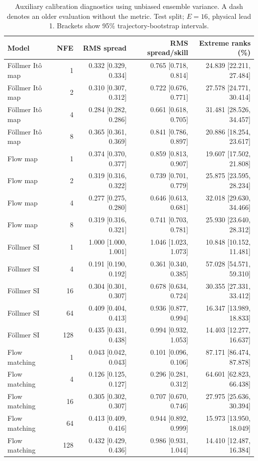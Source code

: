 \begin{table}[t]
\centering
\small
\setlength{\tabcolsep}{3pt}
\caption{Auxiliary calibration diagnostics using unbiased ensemble variance. A dash denotes an older evaluation without the metric. Test split; $E=16$, physical lead 1. Brackets show 95\% trajectory-bootstrap intervals.}
\label{tab:map-rms-calibration}
\begin{tabular}{lrrrr}
\toprule
Model & NFE & RMS spread & RMS spread/skill & Extreme ranks (\%) \\
\midrule
Föllmer Itô map & 1 & 0.332 [0.329, 0.334] & 0.765 [0.718, 0.814] & 24.839 [22.211, 27.484] \\
Föllmer Itô map & 2 & 0.310 [0.307, 0.312] & 0.722 [0.676, 0.771] & 27.578 [24.771, 30.414] \\
Föllmer Itô map & 4 & 0.284 [0.282, 0.286] & 0.661 [0.618, 0.705] & 31.481 [28.526, 34.457] \\
Föllmer Itô map & 8 & 0.365 [0.361, 0.369] & 0.841 [0.786, 0.897] & 20.886 [18.254, 23.617] \\
\addlinespace
Flow map & 1 & 0.374 [0.370, 0.377] & 0.859 [0.813, 0.907] & 19.607 [17.502, 21.808] \\
Flow map & 2 & 0.319 [0.316, 0.322] & 0.739 [0.701, 0.779] & 25.875 [23.595, 28.234] \\
Flow map & 4 & 0.277 [0.275, 0.280] & 0.646 [0.613, 0.681] & 32.018 [29.630, 34.466] \\
Flow map & 8 & 0.319 [0.316, 0.321] & 0.741 [0.703, 0.781] & 25.930 [23.640, 28.312] \\
\addlinespace
Föllmer SI & 1 & 1.000 [1.000, 1.001] & 1.046 [1.023, 1.073] & 10.848 [10.152, 11.481] \\
Föllmer SI & 4 & 0.191 [0.190, 0.192] & 0.361 [0.340, 0.385] & 57.028 [54.571, 59.310] \\
Föllmer SI & 16 & 0.304 [0.301, 0.307] & 0.678 [0.634, 0.724] & 30.355 [27.331, 33.412] \\
Föllmer SI & 64 & 0.409 [0.404, 0.413] & 0.936 [0.877, 0.994] & 16.347 [13.989, 18.833] \\
Föllmer SI & 128 & 0.435 [0.431, 0.438] & 0.994 [0.932, 1.053] & 14.403 [12.277, 16.637] \\
\addlinespace
Flow matching & 1 & 0.043 [0.042, 0.043] & 0.101 [0.096, 0.106] & 87.171 [86.474, 87.878] \\
Flow matching & 4 & 0.126 [0.125, 0.127] & 0.296 [0.281, 0.312] & 64.601 [62.823, 66.438] \\
Flow matching & 16 & 0.305 [0.302, 0.307] & 0.707 [0.670, 0.746] & 27.975 [25.636, 30.394] \\
Flow matching & 64 & 0.413 [0.409, 0.416] & 0.944 [0.892, 0.999] & 15.973 [13.950, 18.049] \\
Flow matching & 128 & 0.432 [0.429, 0.436] & 0.986 [0.931, 1.044] & 14.410 [12.487, 16.384] \\
\bottomrule
\end{tabular}
\end{table}
